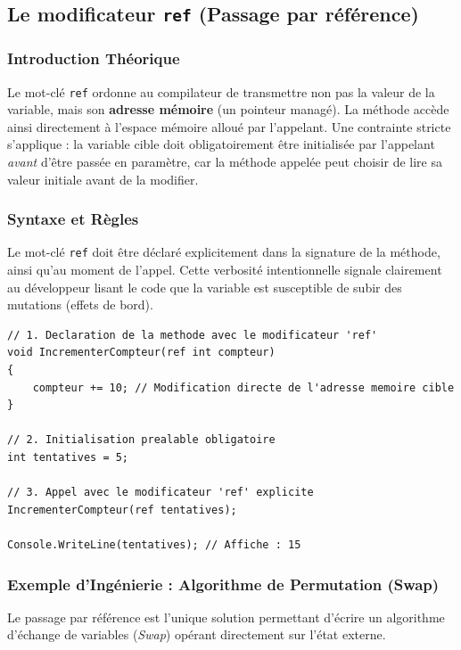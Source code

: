 \subsection{Le modificateur \texttt{ref} (Passage par référence)}

\subsubsection{Introduction Théorique}
Le mot-clé \texttt{ref} ordonne au compilateur de transmettre non pas la valeur de la variable, mais son \textbf{adresse mémoire} (un pointeur managé). La méthode accède ainsi directement à l'espace mémoire alloué par l'appelant. Une contrainte stricte s'applique : la variable cible doit obligatoirement être initialisée par l'appelant \emph{avant} d'être passée en paramètre, car la méthode appelée peut choisir de lire sa valeur initiale avant de la modifier.

\subsubsection{Syntaxe et Règles}
Le mot-clé \texttt{ref} doit être déclaré explicitement dans la signature de la méthode, ainsi qu'au moment de l'appel. Cette verbosité intentionnelle signale clairement au développeur lisant le code que la variable est susceptible de subir des mutations (effets de bord).

\begin{lstlisting}[caption={Utilisation basique de ref}]
// 1. Declaration de la methode avec le modificateur 'ref'
void IncrementerCompteur(ref int compteur)
{
    compteur += 10; // Modification directe de l'adresse memoire cible
}

// 2. Initialisation prealable obligatoire
int tentatives = 5;

// 3. Appel avec le modificateur 'ref' explicite
IncrementerCompteur(ref tentatives);

Console.WriteLine(tentatives); // Affiche : 15
\end{lstlisting}

\subsubsection{Exemple d'Ingénierie : Algorithme de Permutation (Swap)}
Le passage par référence est l'unique solution permettant d'écrire un algorithme d'échange de variables (\emph{Swap}) opérant directement sur l'état externe.

